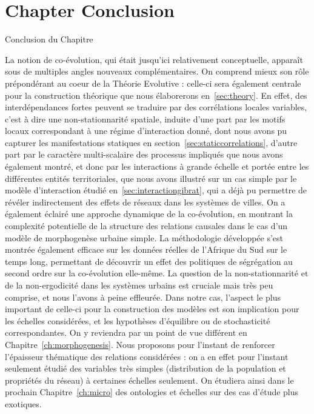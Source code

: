 




\newpage


\section*{Chapter Conclusion}{Conclusion du Chapitre}


La notion de co-évolution, qui était jusqu'ici relativement conceptuelle, apparaît sous de multiples angles nouveaux complémentaires. On comprend mieux son rôle prépondérant au coeur de la Théorie Evolutive : celle-ci sera également centrale pour la construction théorique que nous élaborerons en~\ref{sec:theory}. En effet, des interdépendances fortes peuvent se traduire par des corrélations locales variables, c'est à dire une non-stationnarité spatiale, induite d'une part par les motifs locaux correspondant à une régime d'interaction donné, dont nous avons pu capturer les manifestations statiques en section~\ref{sec:staticcorrelations}, d'autre part par le caractère multi-scalaire des processus impliqués que nous avons également montré, et donc par les interactions à grande échelle et portée entre les différentes entités territoriales, que nous avons illustré sur un cas simple par le modèle d'interaction étudié en~\ref{sec:interactiongibrat}, qui a déjà pu permettre de révéler indirectement des effets de réseaux dans les systèmes de villes. On a également éclairé une approche dynamique de la co-évolution, en montrant la complexité potentielle de la structure des relations causales dans le cas d'un modèle de morphogenèse urbaine simple. La méthodologie développée s'est montrée également efficace sur les données réelles de l'Afrique du Sud sur le temps long, permettant de découvrir un effet des politiques de ségrégation au second ordre sur la co-évolution elle-même. La question de la non-stationnarité et de la non-ergodicité dans les systèmes urbains est cruciale mais très peu comprise, et nous l'avons à peine effleurée. Dans notre cas, l'aspect le plus important de celle-ci pour la construction des modèles est son implication pour les échelles considérées, et les hypothèses d'équilibre ou de stochasticité correspondantes. On y reviendra par un point de vue différent en Chapitre~\ref{ch:morphogenesis}. Nous proposons pour l'instant de renforcer l'épaisseur thématique des relations considérées : on a en effet pour l'instant seulement étudié des variables très simples (distribution de la population et propriétés du réseau) à certaines échelles seulement. On étudiera ainsi dans le prochain Chapitre~\ref{ch:micro} des ontologies et échelles sur des cas d'étude plus exotiques.



\stars

